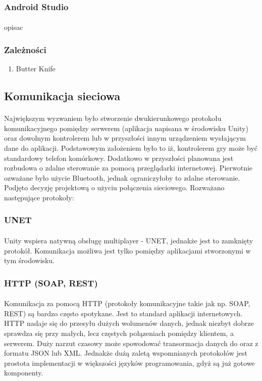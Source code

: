 \documentclass[12pt]{article}
\begin{document}
{{\subsubsection{Android Studio}
\paragraph{}
opisac

\subsubsection{Zależności}
\begin{enumerate}
	\item Butter Knife
\end{enumerate}

\subsection{Komunikacja sieciowa}
\paragraph{}
Największym wyzwaniem było stworzenie dwukierunkowego protokołu komunikacyjnego pomiędzy serwerem (aplikacja napisana w środowisku Unity) oraz dowolnym kontrolerem lub w przyszłości innym urządzeniem wysłającym dane do aplikacji. Podstawowym założeniem było to iż, kontrolerem gry może być standardowy telefon komórkowy. Dodatkowo w przyszłości planowana jest rozbudowa o zdalne sterowanie za pomocą przeglądarki internetowej. Pierwotnie ozważane było użycie Bluetooth, jednak ograniczyłoby to zdalne sterowanie. Podjęto decyzję projektową o użyciu połączenia sieciowego. Rozważano następujące protokoły:

\subsubsection{UNET}
\paragraph{}
Unity wspiera natywną obsługę multiplayer - UNET, jednakże jest to zamknięty protokół. Komunikacja możliwa jest tylko pomiędzy aplikacjami stworzonymi w tym środowisku.

\subsubsection{HTTP (SOAP, REST)}
\paragraph{}
Komunikacja za pomocą HTTP (protokoły komunikacyjne takie jak np. SOAP, REST) są bardzo często spotykane. Jest to standard aplikacji internetowych. HTTP nadaje się do przesyłu dużych wolumenów danych, jednak niezbyt dobrze sprawdza się przy małych, lecz częstych połązeniach pomiędzy klientem, a serwerem. Duży narzut czasowy może spowodować transormacja danych do oraz z formatu JSON lub XML. Jednakże dużą zaletą wspomnianych protokołów jest prostota implementacji w większości języków programowania, gdyż są już gotowe komponenty.
}}
\end{document}
